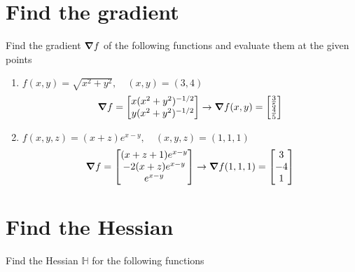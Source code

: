 \documentclass[12pt]{article}
\begin{document}
\section{Find the gradient}
Find the gradient $\grad f$ of the following functions and evaluate them at the given points
\begin{enumerate}
    \item $f(x,y) = \sqrt{x^2+y^2}, \quad (x,y)=(3,4)$
    \[ \grad f = \begin{bmatrix}
        x(x^2+y^2)^{-1/2} \\  y(x^2+y^2)^{-1/2}
    \end{bmatrix} \to \grad f (x,y) = \begin{bmatrix}
        \frac{3}{5} \\ \frac{4}{5}
    \end{bmatrix}\]
    \item $f(x,y,z) = (x+z)e^{x-y}, \quad (x,y,z)=(1,1,1)$
    \[ \grad f = \begin{bmatrix}
        (x+z+1)e^{x-y} \\ -2(x+z)e^{x-y} \\ e^{x-y}
    \end{bmatrix} \to \grad f(1,1,1) = \begin{bmatrix}
        3 \\ -4 \\ 1    \end{bmatrix}\]
\end{enumerate}

\section{Find the Hessian}
Find the Hessian $\mathbb{H}$ for the following functions 
\end{document}

